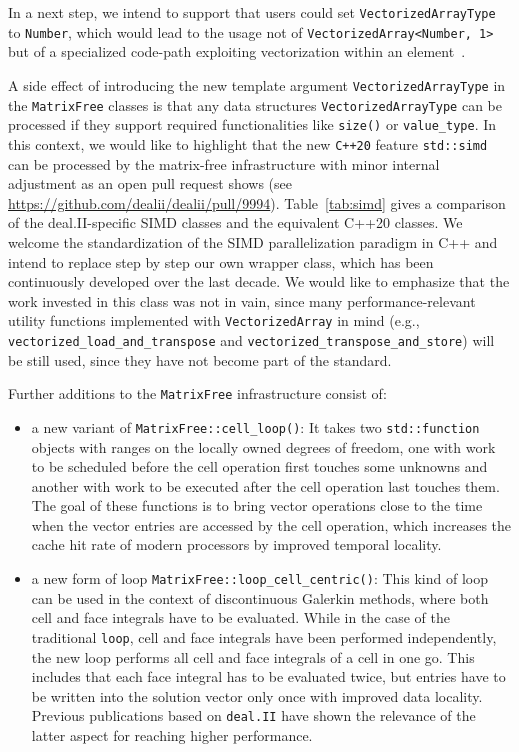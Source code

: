 \documentclass{ansarticle-preprint}
\begin{document}
In a next step, we intend to support that users could set 
\texttt{VectorizedArrayType} to \texttt{Number}, which would lead to the usage not 
of \texttt{VectorizedArray<Number, 1>} but of a specialized code-path exploiting 
vectorization within an element~\cite{KronbichlerKormann2019}.

A side effect of introducing the new template argument \texttt{VectorizedArrayType} 
in the \texttt{MatrixFree} classes is that any data structures 
\texttt{VectorizedArrayType} can be processed if they support required 
functionalities like \texttt{size()} or \texttt{value\_type}. In this context, we 
would like to highlight that the new \texttt{C++20} feature \texttt{std::simd} 
can be processed by the matrix-free infrastructure with minor internal 
adjustment as an open pull request shows 
(see \url{https://github.com/dealii/dealii/pull/9994}).  
Table~\ref{tab:simd} gives a comparison of the deal.II-specific SIMD classes and 
the equivalent C++20 classes. We welcome the standardization of the SIMD 
parallelization paradigm in C++ and intend to replace step by step our own 
wrapper class, which has been continuously developed over the last decade. We 
would like to emphasize that the work invested in this class was not in vain, 
since many performance-relevant utility functions implemented with \texttt{VectorizedArray} in mind (e.g., \texttt{vectorized\_load\_and\_transpose} 
and \texttt{vectorized\_transpose\_and\_store}) will be still used, since they 
have not become part of the standard.

Further additions to the \texttt{MatrixFree} infrastructure consist of:
\begin{itemize}
\item a new variant of \texttt{MatrixFree::cell\_loop()}: It takes two
\texttt{std::function} objects with ranges on the locally owned degrees of freedom, one
with work to be scheduled before the cell operation first touches some
unknowns and another with work to be executed after the cell operation last 
touches them. The goal of
these functions is to bring vector operations close to the time when the
vector entries are accessed by the cell operation, which increases the cache
hit rate of modern processors by improved temporal locality. 
\item a new form of loop \texttt{MatrixFree::loop\_cell\_centric()}: This 
kind of loop can be used in the context of discontinuous Galerkin methods, 
where both cell and face integrals have to be evaluated. While in the case of 
the traditional \texttt{loop}, cell and face integrals have been performed 
independently, the new loop performs all cell and face integrals of a cell in 
one go. This includes that each face integral has to be evaluated twice, but 
entries have to be written into the solution vector only once with improved 
data locality. Previous publications based on \texttt{deal.II} have shown the 
relevance of the latter aspect for reaching higher performance. 
\end{itemize}
\end{document}
